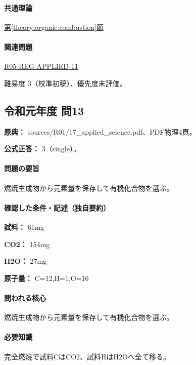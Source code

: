 \paragraph{共通理論} \hyperref[theory:organic:combustion]{第\ref*{theory:organic:combustion}節}

\paragraph{関連問題} \hyperref[q:r05-reg-applied-11]{R05-REG-APPLIED-11}

\par 難易度 3（校準初稿）、優先度未評価。

\subsection{令和元年度 問13}
\label{q:r01-reg-applied-13}

\noindent\textbf{原典：} sources/R01/17\_applied\_science.pdf、PDF物理4頁。

\textbf{公式正答：} 3（single）。

\paragraph{問題の要旨} 燃焼生成物から元素量を保存して有機化合物を選ぶ。

\paragraph{確認した条件・記述（独自要約）}\mbox{}\par

\noindent\textbf{試料：} 61mg\par

\noindent\textbf{CO2：} 154mg\par

\noindent\textbf{H2O：} 27mg\par

\noindent\textbf{原子量：} C=\allowbreak{}12,H=\allowbreak{}1,O=\allowbreak{}16\par

\paragraph{問われる核心} 燃焼生成物から元素量を保存して有機化合物を選ぶ。

\paragraph{必要知識} 完全燃焼で試料CはCO2、試料HはH2Oへ全て移る。

